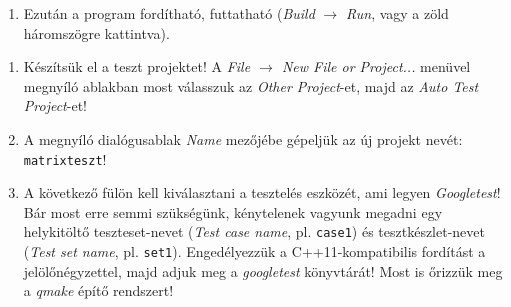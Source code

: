 \begin{frame}
  \begin{enumerate}
    \setcounter{enumi}{\theqt}
    \item Ezután a program fordítható, futtatható (\emph{Build} $\to$ \emph{Run}, vagy a zöld háromszögre kattintva).\\
    \setcounter{qt}{\theenumi}
  \end{enumerate}
\end{frame}

\begin{frame}
  \begin{enumerate}
    \setcounter{enumi}{\theqt}
    \item Készítsük el a teszt projektet! A \emph{File $\to$ New File or Project...} menüvel megnyíló ablakban most válasszuk az \emph{Other Project}-et, majd az \emph{Auto Test Project}-et!\\
    \item A megnyíló dialógusablak \emph{Name} mezőjébe gépeljük az új projekt nevét: \texttt{matrixteszt}!
    \item A következő fülön kell kiválasztani a tesztelés eszközét, ami legyen \emph{Googletest}! Bár most erre semmi szükségünk, kénytelenek vagyunk megadni egy helykitöltő teszteset-nevet (\emph{Test case name}, pl. \texttt{case1}) és tesztkészlet-nevet (\emph{Test set name}, pl. \texttt{set1}). Engedélyezzük a C++11-kompatibilis fordítást a jelölőnégyzettel, majd adjuk meg a \emph{googletest} könyvtárát! Most is őrizzük meg a \emph{qmake} építő rendszert!\\
    \setcounter{qt}{\theenumi}
  \end{enumerate}
\end{frame}

